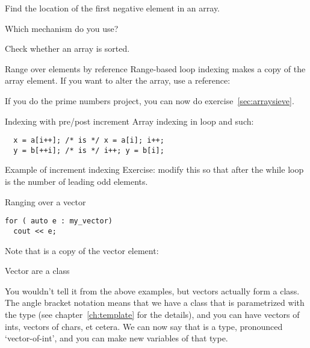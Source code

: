 \begin{exercise}
  \label{ex:array-maxidx}
  Find the location of the first negative element in an array.

  Which mechanism do you use?
\end{exercise}

\begin{exercise}
  \label{ex:array-sorted}
  Check whether an array is sorted.
\end{exercise}

\begin{block}{Range over elements by reference}
  \label{sl:array-range-ref}
  Range-based loop indexing makes a copy of the array element. If you
  want to alter the array, use a reference:
\end{block}

\begin{exercise}
  If you do the prime numbers project, you can now do exercise~\ref{sec:arraysieve}.
\end{exercise}

\begin{block}{Indexing with pre/post increment}
  \label{sl:prepostindex}
Array indexing in  loop and such:
\begin{lstlisting}
  x = a[i++]; /* is */ x = a[i]; i++;
  y = b[++i]; /* is */ i++; y = b[i];
\end{lstlisting}
\end{block}

\begin{block}{Example of increment indexing}
  Exercise: modify this so that after the while loop  is the
  number of leading odd elements.
\end{block}

\begin{block}{Ranging over a vector}
  \label{sl:vector-range}
\begin{lstlisting}
for ( auto e : my_vector)
  cout << e;
\end{lstlisting}
Note that  is a copy of the vector element:
\end{block}

 {Vector are a class}
\label{sec:stdvector}

You wouldn't tell it from the above examples, but vectors actually
form a  class. The angle bracket notation means
that we have a class that is parametrized with the type (see
chapter~\ref{ch:template} for the details), and you can
have vectors of ints, vectors of chars, et cetera. We can now say that
 is a type, pronounced `vector-of-int', and you can
make new variables of that type.

